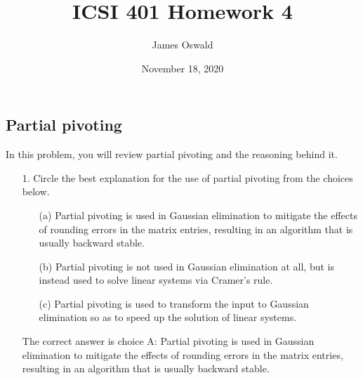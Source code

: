 \documentclass{article}
\author{James Oswald}
\date{November 18, 2020}
\title{ICSI 401 Homework 4}
\begin{document}
\maketitle
\thispagestyle{fancy}
\addtocounter{section}{4}
\subsection{Partial pivoting}
In this problem, you will review partial pivoting and the reasoning behind it.
\begin{itemize}
    \item[1.]  Circle the best explanation for the use of partial pivoting from the choices below.
    \begin{itemize}
        \item[(a)] Partial pivoting is used in Gaussian elimination to mitigate the effects of rounding errors in the matrix entries, resulting in an algorithm that is usually backward stable.
        \item[(b)] Partial pivoting is not used in Gaussian elimination at all, but is instead used to solve linear systems via Cramer’s rule.
        \item[(c)] Partial pivoting is used to transform the input to Gaussian elimination so as to speed up the solution of linear systems.
    \end{itemize}
    \noindent
    \newline\newline\newline
    The correct answer is choice A: Partial pivoting is used in Gaussian elimination to mitigate the effects of rounding errors in the matrix entries, resulting in an algorithm that is usually backward stable.
    

\end{itemize}
\end{document}
